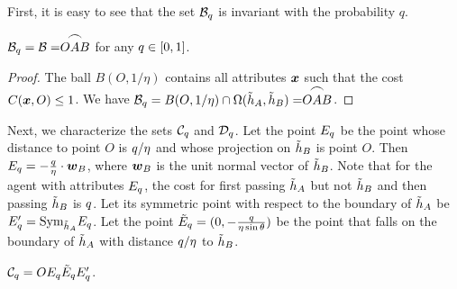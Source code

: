 First, it is easy to see that the set $\mathcal{B}_{q}$ is invariant with the probability $q$.

\begin{lemma}\label{lmm: Bq invariant with q}
    $ \mathcal{B}_{q} = \mathcal{B} =\stackrel{\mbox{\large$\frown$}}{OAB}$ for any $q\in [0,1]$.
\end{lemma}

\begin{proof}
    The ball $B(O,1/\eta)$ contains all attributes $\boldsymbol{x}$ such that the cost $C(\boldsymbol{x},O) \leq 1$. We have $\mathcal{B}_{q} = B(O, 1/\eta) \cap \Omega(\tilde{h}_A,\tilde{h}_B) = \stackrel{\mbox{\large$\frown$}}{OAB}$.
\end{proof}

Next, we characterize the sets $\mathcal{C}_{q}$ and $\mathcal{D}_{q}$. Let the point $E_{q}$ be the point whose distance to point $O$ is $q/\eta$ and whose projection on $\tilde{h}_B$ is point $O$. Then $E_{q} = -\frac{q}{\eta}\cdot \boldsymbol{w}_B$, where $\boldsymbol{w}_B$ is the unit normal vector of $\tilde{h}_B$.
Note that for the agent with attributes $E_{q}$, the cost for first passing $\tilde{h}_A$ but not $\tilde {h}_B$ and then passing $\tilde{h}_B$ is $q$.
Let its symmetric point with respect to the boundary of $\tilde{h}_A$ be $E_{q}' = \boldsymbol{\text{Sym}}_{\tilde{h}_A} E_{q}$.
Let the point $\tilde {E}_{q}  = (0,-\frac{q}{\eta\sin{\theta}})$ be the point that falls on the boundary of $\tilde{h}_A$ with distance $q/\eta$ to $\tilde{h}_B$.

\begin{lemma}\label{lem: Cq}
    $\mathcal{C}_{q} = O E_{q} \tilde {E}_{q} E_{q}'$.
\end{lemma}

